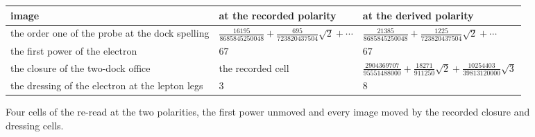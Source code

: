 \begin{figure}[h]\centering
\begin{adjustbox}{max width=\linewidth}\begin{tabular}{lll}\toprule
image & at the recorded polarity & at the derived polarity \\ \midrule
the order one of the probe at the dock spelling & $\tfrac{16195}{8685845250048} + \tfrac{695}{723820437504}\sqrt{2} + \cdots$ & $\tfrac{21385}{8685845250048} + \tfrac{1225}{723820437504}\sqrt{2} + \cdots$ \\
the first power of the electron & $67$ & $67$ \\
the closure of the two-dock office & the recorded cell & $\tfrac{2904369707}{95551488000} + \tfrac{18271}{911250}\sqrt{2} + \tfrac{10254403}{39813120000}\sqrt{3}$ \\
the dressing of the electron at the lepton legs & $3$ & $8$ \\ \bottomrule
\end{tabular}\end{adjustbox}
\caption{Four cells of the re-read at the two polarities, the first power unmoved and every image moved by the recorded closure and dressing cells.}
\end{figure}
\par\medskip{}\label{narr:close:4-8}\par
